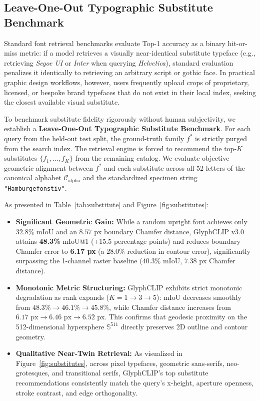 \documentclass[10pt,twocolumn,letterpaper]{article}
\begin{document}
\subsection{Leave-One-Out Typographic Substitute Benchmark}
Standard font retrieval benchmarks evaluate Top-1 accuracy as a binary hit-or-miss metric: if a model retrieves a visually near-identical substitute typeface (e.g., retrieving \textit{Segoe UI} or \textit{Inter} when querying \textit{Helvetica}), standard evaluation penalizes it identically to retrieving an arbitrary script or gothic face. In practical graphic design workflows, however, users frequently upload crops of proprietary, licensed, or bespoke brand typefaces that do not exist in their local index, seeking the closest available visual substitute.

To benchmark substitute fidelity rigorously without human subjectivity, we establish a \textbf{Leave-One-Out Typographic Substitute Benchmark}. For each query from the held-out test split, the ground-truth family $f^*$ is strictly purged from the search index. The retrieval engine is forced to recommend the top-$K$ substitutes $\{f_1, \dots, f_K\}$ from the remaining catalog. We evaluate objective geometric alignment between $f^*$ and each substitute across all 52 letters of the canonical alphabet $\mathcal{C}_{\text{alpha}}$ and the standardized specimen string \texttt{"Hamburgefonstiv"}.

As presented in Table~\ref{tab:substitute} and Figure~\ref{fig:substitutes}:
\begin{itemize}
    \item \textbf{Significant Geometric Gain:} While a random upright font achieves only $32.8\%$ mIoU and an $8.57\text{ px}$ boundary Chamfer distance, GlyphCLIP v3.0 attains \textbf{48.3\%} mIoU@1 (+15.5 percentage points) and reduces boundary Chamfer error to \textbf{6.17 px} (a 28.0\% reduction in contour error), significantly surpassing the 1-channel raster baseline ($40.3\%$ mIoU, $7.38\text{ px}$ Chamfer distance).
    \item \textbf{Monotonic Metric Structuring:} GlyphCLIP exhibits strict monotonic degradation as rank expands ($K=1 \to 3 \to 5$): mIoU decreases smoothly from $48.3\% \to 46.1\% \to 45.8\%$, while Chamfer distance increases from $6.17\text{ px} \to 6.46\text{ px} \to 6.52\text{ px}$. This confirms that geodesic proximity on the 512-dimensional hypersphere $\mathbb{S}^{511}$ directly preserves 2D outline and contour geometry.
    \item \textbf{Qualitative Near-Twin Retrieval:} As visualized in Figure~\ref{fig:substitutes}, across pixel typefaces, geometric sans-serifs, neo-grotesques, and transitional serifs, GlyphCLIP's top substitute recommendations consistently match the query's x-height, aperture openness, stroke contrast, and edge orthogonality.
\end{itemize}
\end{document}
